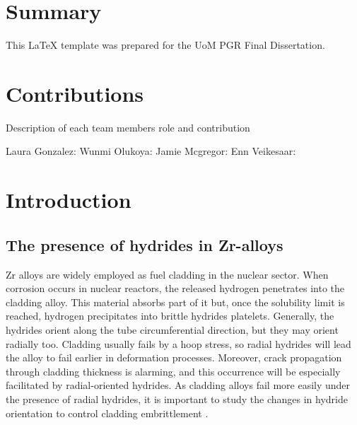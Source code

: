 \documentclass[12pt]{article}
\begin{document}
\section*{Summary}
     This LaTeX template was prepared for the UoM PGR Final Dissertation.
     
\newpage
\begin{singlespacing}
\tableofcontents
\end{singlespacing}
\setlength{\parskip}{1em}
\renewcommand{\baselinestretch}{2.0}

\newpage 
{}
\setcounter{page}{1}
\onehalfspacing

\section{Contributions}

Description of each team members role and contribution

Laura Gonzalez:
Wunmi Olukoya:
Jamie Mcgregor: 
Enn Veikesaar:




\section{Introduction}

\subsection{The presence of hydrides in Zr-alloys}

\justify
\noindent
Zr alloys are widely employed as fuel cladding in the nuclear sector. When corrosion occurs in nuclear reactors, the released hydrogen penetrates into the cladding alloy. This material absorbs part of it but, once the solubility limit is reached, hydrogen precipitates into brittle hydrides platelets. Generally, the hydrides orient along the tube circumferential direction, but they may orient radially too. Cladding usually fails by a hoop stress, so radial hydrides will lead the alloy to fail earlier in deformation processes. Moreover, crack propagation through cladding thickness is alarming, and this occurrence will be especially facilitated by radial-oriented hydrides. As cladding alloys fail more easily under the presence of radial hydrides, it is important to study the changes in hydride orientation to control cladding embrittlement \cite{SIMON2021152817, COLAS2013586, SHARMA2018546, SUNIL2020152457}.
\end{document}
